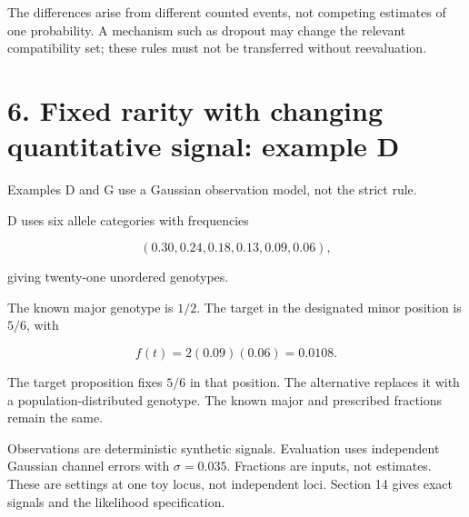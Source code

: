 \documentclass[
]{article}
\begin{document}
The differences arise from different counted events, not competing
estimates of one probability. A mechanism such as dropout may change the
relevant compatibility set; these rules must not be transferred without
reevaluation.

\section{6. Fixed rarity with changing quantitative signal: example
D}\label{fixed-rarity-with-changing-quantitative-signal-example-d}

Examples D and G use a Gaussian observation model, not the strict rule.

D uses six allele categories with frequencies

\[
(0.30,0.24,0.18,0.13,0.09,0.06),
\]

giving twenty-one unordered genotypes.

The known major genotype is \(1/2\). The target in the designated minor
position is \(5/6\), with

\[
f(t)=2(0.09)(0.06)=0.0108.
\]

The target proposition fixes \(5/6\) in that position. The alternative
replaces it with a population-distributed genotype. The known major and
prescribed fractions remain the same.

Observations are deterministic synthetic signals. Evaluation uses
independent Gaussian channel errors with \(\sigma=0.035\). Fractions are
inputs, not estimates. These are settings at one toy locus, not
independent loci. Section 14 gives exact signals and the likelihood
specification.
\end{document}
